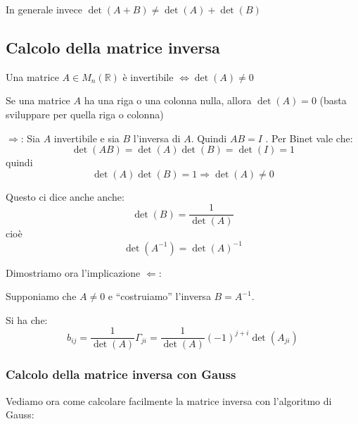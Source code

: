 \documentclass[
  a4paper,
]{article}
\begin{document}
\begin{notebox}
In generale invece \(\det(A + B) \neq \det(A) + \det(B)\)
\end{notebox}

\hypertarget{calcolo-della-matrice-inversa}{%
\subsection{Calcolo della matrice
inversa}\label{calcolo-della-matrice-inversa}}

\begin{propositionbox}
Una matrice \(A \in M_{n}(\mathbb{R})\) è invertibile
\(\iff \det(A) \not = 0\)
\end{propositionbox}

\begin{notebox}
Se una matrice \(A\) ha una riga o una colonna nulla, allora
\(\det(A) = 0\) (basta sviluppare per quella riga o colonna)
\end{notebox}

\begin{proofbox}
\(\Rightarrow\): Sia \(A\) invertibile e sia \(B\) l'inversa di \(A\).
Quindi \(AB = I\) . Per Binet vale che: \[
\det(AB) = \det(A)\det(B) = \det(I) = 1
\] quindi \[
\det(A)\det(B)=1 \Rightarrow \det(A) \not = 0
\]
\end{proofbox}

\begin{notebox}
Questo ci dice anche anche: \[
\det(B) = \frac{1}{\det(A)}
\] cioè \[
\det(A^{-1}) = \det(A)^{-1}
\]
\end{notebox}

\begin{proofbox}
Dimostriamo ora l'implicazione \(\Leftarrow\):

Supponiamo che \(A \not = 0\) e ``costruiamo'' l'inversa \(B = A^{-1}\).

Si ha che: \[
b_{ij} =  \frac{1}{\det(A)} \Gamma_{ji} =  \frac{1}{\det(A)} (-1)^{j+i} \det(A_{ji})
\]
\end{proofbox}

\hypertarget{calcolo-della-matrice-inversa-con-gauss}{%
\subsubsection{Calcolo della matrice inversa con
Gauss}\label{calcolo-della-matrice-inversa-con-gauss}}

Vediamo ora come calcolare facilmente la matrice inversa con l'algoritmo
di Gauss:
\end{document}
